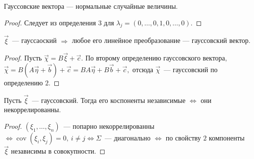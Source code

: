 	\begin{property}[Коши]
		Гауссовские вектора --- нормальные случайные величины.
		\begin{proof}
			Следует из определения \(3\) для \(\lambda_j = (0, \ldots, 0, 1, 0, \ldots, 0).\)
		\end{proof}
	\end{property}

	\begin{property}
		\(\vec{\xi}\)~--- гауссаоский \(\Rightarrow\) любое его линейное преобразование --- гауссовский вектор.
		\begin{proof}
			Пусть \(\vec{\chi} = B\vec{\xi} + \vec{c}.\) По второму определению гауссовского вектора, \(\vec{\chi} = B(A\vec{\eta} + \vec{b}) + \vec{c} = BA\vec{\eta} + B\vec{b} + \vec{c},\) отсюда \(\vec{\chi}\)~--- гауссовский по определению \(2.\)
		\end{proof}
	\end{property}
	\begin{property}
		Пусть \(\vec{\xi}\)~--- гауссовский. Тогда его коспоненты независимые \(\Leftrightarrow\) они некоррелированны.
		\begin{proof}
			\((\xi_1, \ldots, \xi_n)\)~--- попарно некоррелированны \(\Leftrightarrow \operatorname{cov}(\xi_i, \xi_j) = 0, ~i \neq j \Leftrightarrow \Sigma\)~--- диагонально \(\Leftrightarrow\) по свойству \(2\) компоненты \(\vec{\xi}\) независимы в совокупности.
		\end{proof}
	\end{property}